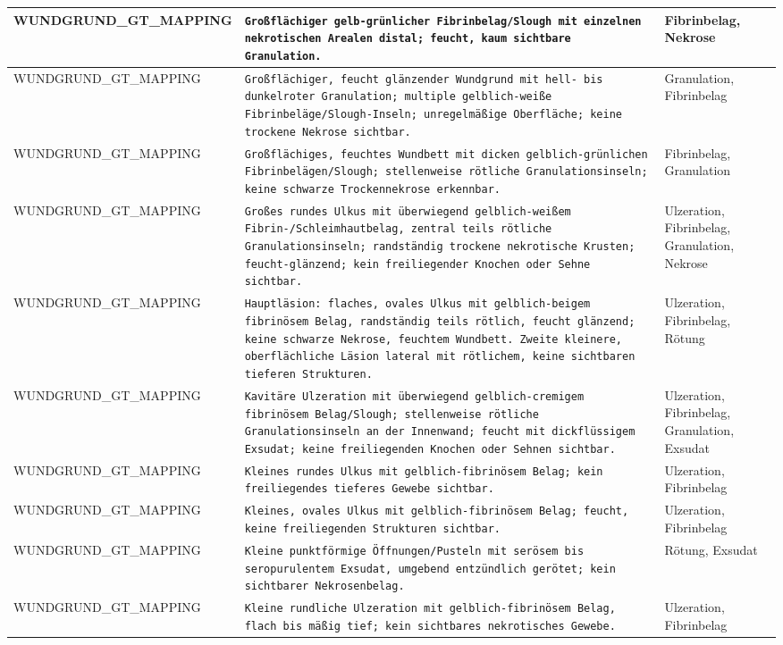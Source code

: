 \begin{longtable}{|p{3.5cm}|p{5cm}|p{6.5cm}|}
WUNDGRUND\_GT\_MAPPING & \texttt{Großflächiger gelb‑grünlicher Fibrinbelag/Slough mit einzelnen nekrotischen Arealen distal; feucht, kaum sichtbare Granulation.} & Fibrinbelag, Nekrose \\ \hline
WUNDGRUND\_GT\_MAPPING & \texttt{Großflächiger, feucht glänzender Wundgrund mit hell- bis dunkelroter Granulation; multiple gelblich‑weiße Fibrinbeläge/Slough-Inseln; unregelmäßige Oberfläche; keine trockene Nekrose sichtbar.} & Granulation, Fibrinbelag \\ \hline
WUNDGRUND\_GT\_MAPPING & \texttt{Großflächiges, feuchtes Wundbett mit dicken gelblich-grünlichen Fibrinbelägen/Slough; stellenweise rötliche Granulationsinseln; keine schwarze Trockennekrose erkennbar.} & Fibrinbelag, Granulation \\ \hline
WUNDGRUND\_GT\_MAPPING & \texttt{Großes rundes Ulkus mit überwiegend gelblich-weißem Fibrin-/Schleimhautbelag, zentral teils rötliche Granulationsinseln; randständig trockene nekrotische Krusten; feucht-glänzend; kein freiliegender Knochen oder Sehne sichtbar.} & Ulzeration, Fibrinbelag, Granulation, Nekrose \\ \hline
WUNDGRUND\_GT\_MAPPING & \texttt{Hauptläsion: flaches, ovales Ulkus mit gelblich-beigem fibrinösem Belag, randständig teils rötlich, feucht glänzend; keine schwarze Nekrose, feuchtem Wundbett. Zweite kleinere, oberflächliche Läsion lateral mit rötlichem, keine sichtbaren tieferen Strukturen.} & Ulzeration, Fibrinbelag, Rötung \\ \hline
WUNDGRUND\_GT\_MAPPING & \texttt{Kavitäre Ulzeration mit überwiegend gelblich-cremigem fibrinösem Belag/Slough; stellenweise rötliche Granulationsinseln an der Innenwand; feucht mit dickflüssigem Exsudat; keine freiliegenden Knochen oder Sehnen sichtbar.} & Ulzeration, Fibrinbelag, Granulation, Exsudat \\ \hline
WUNDGRUND\_GT\_MAPPING & \texttt{Kleines rundes Ulkus mit gelblich-fibrinösem Belag; kein freiliegendes tieferes Gewebe sichtbar.} & Ulzeration, Fibrinbelag \\ \hline
WUNDGRUND\_GT\_MAPPING & \texttt{Kleines, ovales Ulkus mit gelblich-fibrinösem Belag; feucht, keine freiliegenden Strukturen sichtbar.} & Ulzeration, Fibrinbelag \\ \hline
WUNDGRUND\_GT\_MAPPING & \texttt{Kleine punktförmige Öffnungen/Pusteln mit serösem bis seropurulentem Exsudat, umgebend entzündlich gerötet; kein sichtbarer Nekrosenbelag.} & Rötung, Exsudat \\ \hline
WUNDGRUND\_GT\_MAPPING & \texttt{Kleine rundliche Ulzeration mit gelblich-fibrinösem Belag, flach bis mäßig tief; kein sichtbares nekrotisches Gewebe.} & Ulzeration, Fibrinbelag \\ \hline

\end{longtable}
